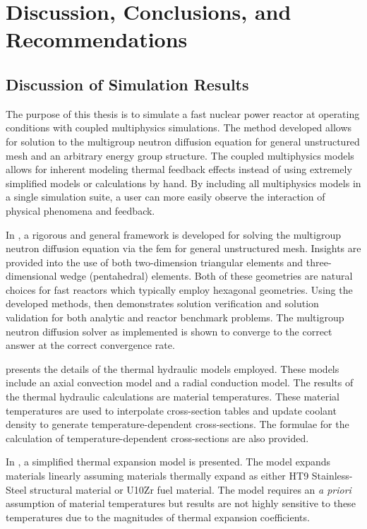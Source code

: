 \chapter{Discussion, Conclusions, and Recommendations}
\label{ch:conclusions}

\section{Discussion of Simulation Results}

  The purpose of this thesis is to simulate a fast nuclear power reactor at 
  operating conditions with coupled multiphysics simulations. The method
  developed allows for solution to the multigroup neutron diffusion equation for
  general unstructured mesh and an arbitrary energy group structure. The coupled 
  multiphysics models allows for inherent modeling thermal feedback effects 
  instead of using extremely simplified models or calculations by hand. By 
  including all multiphysics models in a single simulation suite, a user can 
  more easily observe the interaction of physical phenomena and feedback.

  In , a rigorous and general framework is developed
  for solving the multigroup neutron diffusion equation via the \gls{fem} for
  general unstructured mesh. Insights are provided into the use of both
  two-dimension triangular elements and three-dimensional wedge (pentahedral)
  elements. Both of these geometries are natural choices for fast reactors which 
  typically employ hexagonal geometries. Using the developed methods,
   then demonstrates solution verification and
  solution validation for both analytic and reactor benchmark problems. The
  multigroup neutron diffusion solver as implemented is shown to converge to the
  correct answer at the correct convergence rate.

   presents the details of the thermal hydraulic
  models employed. These models include an axial convection model and a radial
  conduction model. The results of the thermal hydraulic calculations are
  material temperatures. These material temperatures are used to interpolate 
  cross-section tables and update coolant density to generate 
  temperature-dependent cross-sections. The formulae for the calculation of
  temperature-dependent cross-sections are also provided.

  In , a simplified thermal expansion model is
  presented. The model expands materials linearly assuming materials thermally
  expand as either HT9 Stainless-Steel structural material or U10Zr fuel 
  material. The model requires an \textit{a priori} assumption of material 
  temperatures but results are not highly sensitive to these temperatures due 
  to the magnitudes of thermal expansion coefficients.

